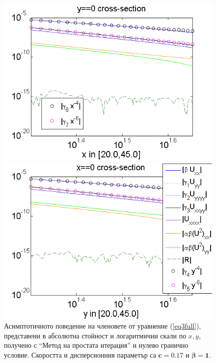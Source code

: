 \documentclass[a4paper]{article}
\newcommand{\rf}[1]{(\ref{#1})}
\theoremstyle{remark}
\begin{document}
\begin{figure}[ht]
	\begin{minipage}[b]{0.95\linewidth}
		\includegraphics[width=\linewidth]{AssymptForEachTerm/c017_bt1_5/ChristovIC_AlongX_50_ZB2_bt1_c017_h020_O(h^6).png}
	\end{minipage}
	\begin{minipage}[b]{0.95\linewidth}
		\includegraphics[width=\linewidth]{AssymptForEachTerm/c017_bt1_5/ChristovIC_AlongY_50_ZB2_bt1_c017_h020_O(h^6).png}
	\end{minipage}
	\caption{Асимптотичното поведение на членовете от уравнение \rf{eq3full}, представени в абсолютна стойност и логаритмични скали по $x,y$, получено с ``Метод на простата итерация'' и нулево гранично условие. Скоростта и дисперсионния параметър са $\boldsymbol{c=0.17}$ и $\boldsymbol{\beta = 1}$. }
	\label{fig:assympt_c017bt1}
\end{figure}
\end{document}
